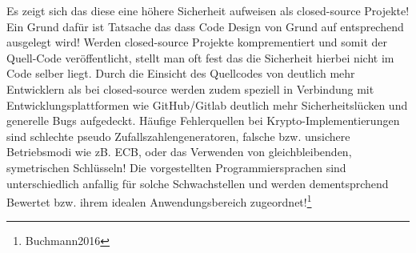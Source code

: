 \documentclass[a4paper,12pt]{scrartcl}
\begin{document}
Es zeigt sich das diese eine höhere Sicherheit aufweisen als closed-source Projekte! Ein Grund dafür ist Tatsache das dass Code Design von Grund auf entsprechend ausgelegt wird! Werden closed-source Projekte komprementiert und somit der Quell-Code veröffentlicht, stellt man oft fest das die Sicherheit hierbei nicht im Code selber liegt. Durch die Einsicht des Quellcodes von deutlich mehr Entwicklern als bei closed-source werden zudem speziell in Verbindung mit Entwicklungsplattformen wie GitHub/Gitlab deutlich mehr Sicherheitslücken und generelle Bugs aufgedeckt.
Häufige Fehlerquellen bei Krypto-Implementierungen sind schlechte pseudo Zufallszahlengeneratoren, falsche bzw. unsichere Betriebsmodi wie zB. ECB, oder das Verwenden von gleichbleibenden, symetrischen Schlüsseln! \newpage
Die vorgestellten Programmiersprachen sind unterschiedlich anfallig für solche Schwachstellen und werden dementsprchend Bewertet bzw. ihrem idealen Anwendungsbereich zugeordnet!\footnote{Buchmann2016}



 
\newpage
\end{document}
